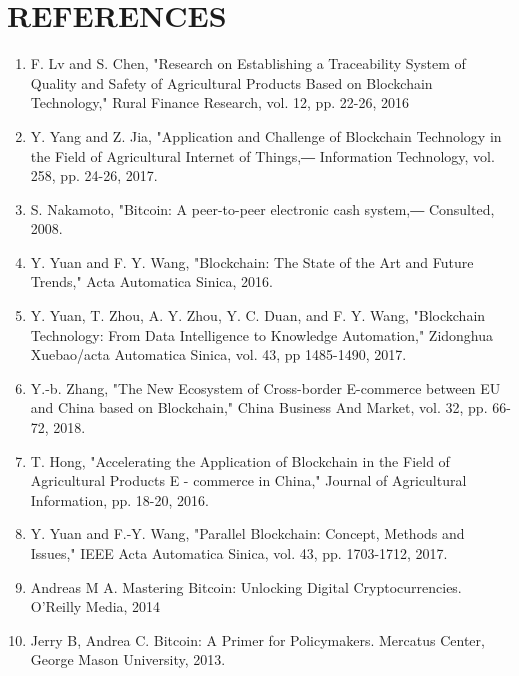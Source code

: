\documentclass[oneside,a4paper,12pt]{report}
\begin{document}
{%
\chapter{REFERENCES}
\begin{enumerate}
\item F. Lv and S. Chen, "Research on Establishing a Traceability System of Quality and Safety of
Agricultural Products Based on Blockchain Technology," Rural Finance Research, vol. 12, pp.
22-26, 2016


\item Y. Yang and Z. Jia, "Application and Challenge of Blockchain Technology in the Field of Agricultural Internet of Things,― Information Technology, vol. 258, pp. 24-26, 2017.

\item S. Nakamoto, "Bitcoin: A peer-to-peer electronic cash system,― Consulted, 2008.

\item Y. Yuan and F. Y. Wang, "Blockchain: The State of the Art and Future Trends," Acta Automatica Sinica, 2016.

\item Y. Yuan, T. Zhou, A. Y. Zhou, Y. C. Duan, and F. Y. Wang, "Blockchain Technology: From Data Intelligence to Knowledge Automation," Zidonghua Xuebao/acta Automatica Sinica, vol. 43, pp 1485-1490, 2017.
\item Y.-b. Zhang, "The New Ecosystem of Cross-border E-commerce between EU and China based
on Blockchain," China Business And Market, vol. 32, pp. 66-72, 2018.


\item T. Hong, "Accelerating the Application of Blockchain in the Field of Agricultural Products E -
commerce in China," Journal of Agricultural Information, pp. 18-20, 2016.


\item Y. Yuan and F.-Y. Wang, "Parallel Blockchain: Concept, Methods and Issues," IEEE Acta Automatica Sinica, vol. 43, pp. 1703-1712, 2017.

\item Andreas M A. Mastering Bitcoin: Unlocking Digital Cryptocurrencies. O'Reilly Media, 2014

\item Jerry B, Andrea C. Bitcoin: A Primer for Policymakers. Mercatus Center, George Mason University, 2013.

\end{enumerate}

}
\end{document}
